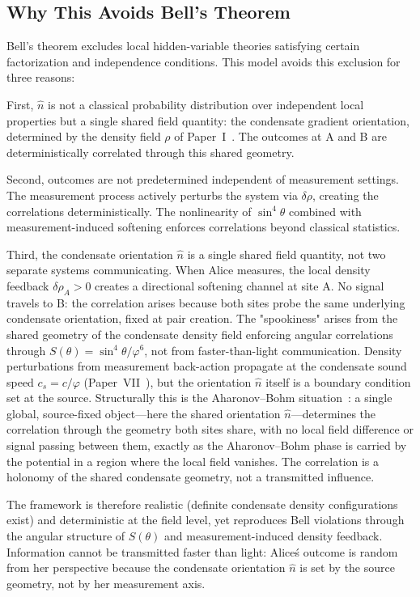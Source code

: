 \documentclass[11pt,a4paper]{article}
\theoremstyle{definition}
\theoremstyle{remark}
\newcommand{\vp}{\varphi}
\begin{document}
\subsection{Why This Avoids Bell's Theorem}

Bell's theorem excludes local hidden-variable theories satisfying certain factorization and independence conditions. This model avoids this exclusion for three reasons:

First, $\hat{n}$ is not a classical probability distribution over independent local properties but a single shared field quantity: the condensate gradient orientation, determined by the density field $\rho$ of Paper~I~\cite{Paper1}. The outcomes at A and B are deterministically correlated through this shared geometry.

Second, outcomes are not predetermined independent of measurement settings. The measurement process actively perturbs the system via $\delta\rho$, creating the correlations deterministically. The nonlinearity of $\sin^4\theta$ combined with measurement-induced softening enforces correlations beyond classical statistics.

Third, the condensate orientation $\hat{n}$ is a single shared field quantity, not two separate systems communicating. When Alice measures, the local density feedback $\delta\rho_A > 0$ creates a directional softening channel at site A. No signal travels to B: the correlation arises because both sites probe the same underlying condensate orientation, fixed at pair creation. The "spookiness" arises from the shared geometry of the condensate density field enforcing angular correlations through $S(\theta)=\sin^4\!\theta/\vp^6$, not from faster-than-light communication. Density perturbations from measurement back-action propagate at the condensate sound speed $c_s = c/\vp$ (Paper~VII~\cite{Paper7}), but the orientation $\hat{n}$ itself is a boundary condition set at the source. Structurally this is the Aharonov--Bohm situation~\cite{AharonovBohm1959}: a single global, source-fixed object---here the shared orientation $\hat{n}$---determines the correlation through the geometry both sites share, with no local field difference or signal passing between them, exactly as the Aharonov--Bohm phase is carried by the potential in a region where the local field vanishes. The correlation is a holonomy of the shared condensate geometry, not a transmitted influence.

The framework is therefore realistic (definite condensate density configurations exist) and deterministic at the field level, yet reproduces Bell violations through the angular structure of $S(\theta)$ and measurement-induced density feedback. Information cannot be transmitted faster than light: Alice\'s outcome is random from her perspective because the condensate orientation $\hat{n}$ is set by the source geometry, not by her measurement axis.
\end{document}
